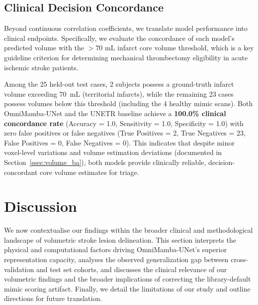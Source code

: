 \documentclass[pdflatex,sn-mathphys-num]{sn-jnl}
\begin{document}
\subsection{Clinical Decision Concordance}\label{ssec:clinical_concordance}

Beyond continuous correlation coefficients, we translate model performance into clinical endpoints. Specifically, we evaluate the concordance of each model's predicted volume with the $>70\text{~mL}$ infarct core volume threshold, which is a key guideline criterion for determining mechanical thrombectomy eligibility in acute ischemic stroke patients. 

Among the 25 held-out test cases, 2 subjects possess a ground-truth infarct volume exceeding 70~mL (territorial infarcts), while the remaining 23 cases possess volumes below this threshold (including the 4 healthy mimic scans). Both OmniMamba-UNet and the UNETR baseline achieve a \textbf{100.0\% clinical concordance rate} (Accuracy = 1.0, Sensitivity = 1.0, Specificity = 1.0) with zero false positives or false negatives (True Positives = 2, True Negatives = 23, False Positives = 0, False Negatives = 0). This indicates that despite minor voxel-level variations and volume estimation deviations (documented in Section~\ref{ssec:volume_ba}), both models provide clinically reliable, decision-concordant core volume estimates for triage.

\section{Discussion}\label{sec:discussion}

We now contextualise our findings within the broader clinical and methodological landscape of volumetric stroke lesion delineation. This section interprets the physical and computational factors driving OmniMamba-UNet's superior representation capacity, analyses the observed generalization gap between cross-validation and test set cohorts, and discusses the clinical relevance of our volumetric findings and the broader implications of correcting the library-default mimic scoring artifact. Finally, we detail the limitations of our study and outline directions for future translation.
\end{document}
